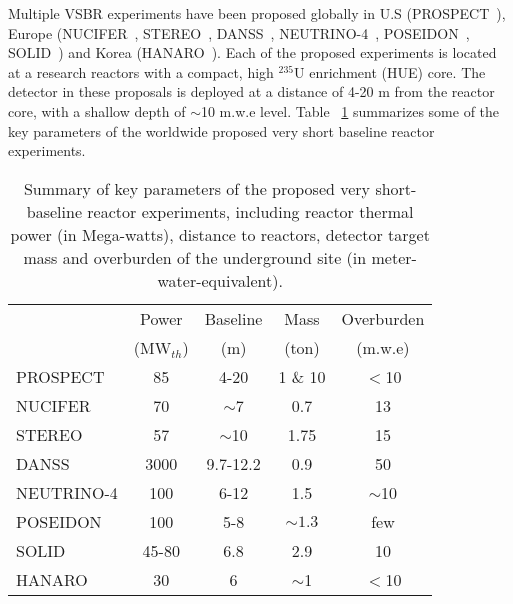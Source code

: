 Multiple VSBR experiments have been proposed globally in U.S (PROSPECT~\cite{PROSPECT}), Europe (NUCIFER~\cite{NUCIFER-2010, NUCIFER-2014}, STEREO~\cite{NUCIFER-2014}, DANSS~\cite{DANSS}, NEUTRINO-4~\cite{NEUTRINO4-2012,NEUTRINO4-2014}, POSEIDON~\cite{POSEIDON}, SOLID~\cite{SoLid}) and Korea (HANARO~\cite{HANARO}). Each of the proposed experiments is located at a research reactors with a compact, high $^{235}$U enrichment (HUE) core. The detector in these proposals is deployed at a distance of 4-20 m from the reactor core, with a shallow depth of $\sim$10 m.w.e level. Table ~\ref{tab:sterile} summarizes some of the key parameters of the worldwide proposed very short baseline reactor experiments.

\begin{table}[t]
  \begin{tabular}{lcccc}
  \hline
  & Power & Baseline & Mass & Overburden \\
  & (MW$_{th}$) & (m) & (ton) & (m.w.e)    \\
  \hline
  PROSPECT  & 85  & 4-20 & 1 \& 10     & $<$10 \\
  NUCIFER   & 70 & $\sim$7  & 0.7 & 13\\
  STEREO & 57  & $\sim$10 & 1.75  & 15\\
  DANSS & 3000  & 9.7-12.2  & 0.9  & 50\\
  NEUTRINO-4 & 100  & 6-12  & 1.5  & $\sim$10 \\
  POSEIDON & 100  & 5-8  & $\sim1.3$ & few\\
  SOLID & 45-80 & 6.8  & 2.9  & 10\\
  HANARO & 30  & 6  & $\sim$1  & $<$10\\
  \hline
  \end{tabular}
  \caption{Summary of key parameters of the proposed very short-baseline reactor experiments, including reactor thermal power (in Mega-watts), distance to reactors, detector target mass and overburden of the underground site (in meter-water-equivalent).}
\label{tab:sterile}
\end{table}

